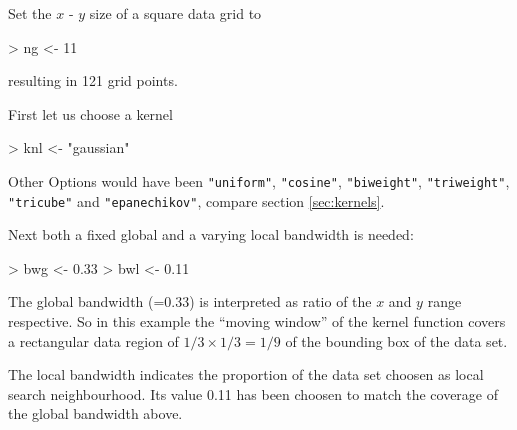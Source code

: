 \documentclass[nojss]{jss}
\begin{document}
Set the $x$ - $y$ size of a square data grid to
\begin{Schunk}
\begin{Sinput}
> ng <- 11
\end{Sinput}
\end{Schunk}
resulting in 121 grid points.

First let us choose a kernel
\begin{Schunk}
\begin{Sinput}
> knl <- "gaussian"
\end{Sinput}
\end{Schunk}
Other Options would have been \texttt{"uniform"}, \texttt{"cosine"},
\texttt{"biweight"}, \texttt{"triweight"}, \texttt{"tricube"} and
\texttt{"epanechikov"}, compare section \ref{sec:kernels}.

Next both a fixed global and a varying local bandwidth is needed:
\begin{Schunk}
\begin{Sinput}
> bwg <- 0.33  
> bwl <- 0.11  
\end{Sinput}
\end{Schunk}
The global bandwidth (=0.33) is interpreted as ratio of the
$x$ and $y$ range respective. So in this example the ``moving window''
of the kernel function covers a rectangular data region of
$1/3\times 1/3=1/9$ of the bounding box of the data set.

The local bandwidth indicates the proportion of the data set choosen
as local search neighbourhood. Its value 0.11 has been choosen
to match the coverage of the global bandwidth above.
\end{document}
